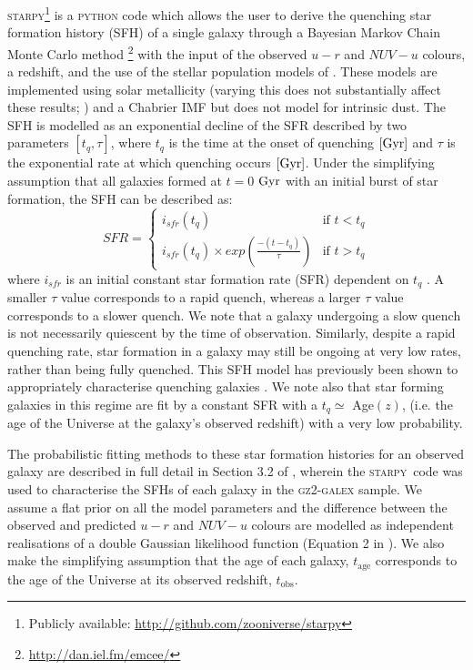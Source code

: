 \documentclass[useAMS,usenatbib]{mn2e}
\def\starpy ~{\textsc{starpy}}
\begin{document}
\textsc{starpy}\footnote{Publicly available: \url{http://github.com/zooniverse/starpy}} is a \textsc{python} code which allows the user to derive the quenching star formation history (SFH) of a single galaxy through a Bayesian Markov Chain Monte Carlo method \citep{emcee13}\footnote{\url{http://dan.iel.fm/emcee/}} with the input of the observed $u-r$ and $NUV-u$ colours, a redshift, and the use of the stellar population models of \cite{BC03}.  These models are implemented using solar metallicity (varying this does not substantially affect these results; \citealt{smethurst15}) and a Chabrier IMF \citep{chabrier03} but does not model for intrinsic dust. The SFH is modelled as an exponential decline of the SFR described by two parameters $[t_{q}, \tau]$, where $t_{q}$ is the time at the onset of quenching $\rm{[Gyr]}$ and $\tau$ is the exponential rate at which quenching occurs $\rm{[Gyr]}$. Under the simplifying assumption that all galaxies formed at $t=0$ $\rm{ Gyr}$ with an initial burst of star formation, the SFH can be described as: 
\begin{equation}\label{sfh}
SFR =
\begin{cases}
i_{sfr}(t_{q}) & \text{if } t < t_{q} \\
i_{sfr}(t_{q}) \times exp{\left( \frac{-(t-t_{q})}{\tau}\right)} & \text{if } t > t_{q} 
\end{cases}
\end{equation}
where $i_{sfr}$ is an initial constant star formation rate (SFR) dependent on $t_{q}$ \citep{schawinski14, smethurst15}.  A smaller $\tau$ value corresponds to a rapid quench, whereas a larger $\tau$ value corresponds to a slower quench. We note that a galaxy undergoing a slow quench is not necessarily quiescent by the time of observation. Similarly, despite a rapid quenching rate, star formation in a galaxy may still be ongoing at very low rates, rather than being fully quenched. This SFH model has previously been shown to appropriately characterise quenching galaxies \citep{Weiner06, Martin07, Noeske07,schawinski14}. We note also that star forming galaxies in this regime are fit by a constant SFR with a $t_{q} \simeq$ Age$(z)$, (i.e. the age of the Universe at the galaxy's observed redshift) with a very low probability.

The probabilistic fitting methods to these star formation histories for an observed galaxy are described in full detail in Section 3.2 of \cite{smethurst15}, wherein the \starpy ~~code was used to characterise the SFHs of each galaxy in the \textsc{gz2-galex} sample. We assume a flat prior on all the model parameters and the difference between the observed and predicted $u-r$ and $NUV-u$ colours are modelled as independent realisations of a double Gaussian likelihood function (Equation 2 in \citealt{smethurst15}). We also make the simplifying assumption that the age of each galaxy, $t_\mathrm{age}$ corresponds to the age of the Universe at its observed redshift, $t_\mathrm{obs}$.
\end{document}
